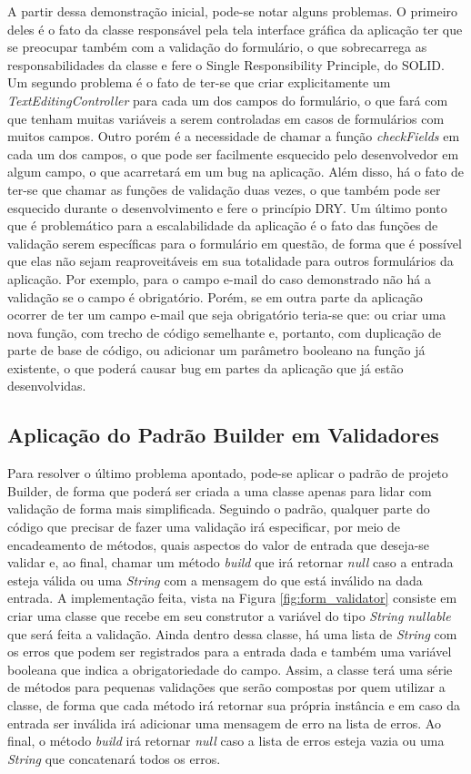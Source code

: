 \documentclass[12pt, %
openright, 
oneside, %
a4paper,    %
brazil]{facom-ufu-abntex2}
\begin{document}
A partir dessa demonstração inicial, pode-se notar alguns problemas. O primeiro deles é o fato da classe responsável pela tela interface gráfica da aplicação ter que se preocupar também com a validação do formulário, o que sobrecarrega as responsabilidades da classe e fere o Single Responsibility Principle, do SOLID. Um segundo problema é o fato de ter-se que criar explicitamente um \textit{TextEditingController} para cada um dos campos do formulário, o que fará com que tenham muitas variáveis a serem controladas em casos de formulários com muitos campos. Outro porém é a necessidade de chamar a função \textit{checkFields} em cada um dos campos, o que pode ser facilmente esquecido pelo desenvolvedor em algum campo, o que acarretará em um bug na aplicação. Além disso, há o fato de ter-se que chamar as funções de validação duas vezes, o que também pode ser esquecido durante o desenvolvimento e fere o princípio DRY. Um último ponto que é problemático para a escalabilidade da aplicação é o fato das funções de validação serem específicas para o formulário em questão, de forma que é possível que elas não sejam reaproveitáveis em sua totalidade para outros formulários da aplicação. Por exemplo, para o campo e-mail do caso demonstrado não há a validação se o campo é obrigatório. Porém, se em outra parte da aplicação ocorrer de ter um campo e-mail que seja obrigatório teria-se que: ou criar uma nova função, com trecho de código semelhante e, portanto, com duplicação de parte de base de código, ou adicionar um parâmetro booleano na função já existente, o que poderá causar bug em partes da aplicação que já estão desenvolvidas.

\subsection{Aplicação do Padrão Builder em Validadores}

Para resolver o último problema apontado, pode-se aplicar o padrão de projeto Builder, de forma que poderá ser criada a uma classe apenas para lidar com validação de forma mais simplificada. Seguindo o padrão, qualquer parte do código que precisar de fazer uma validação irá especificar, por meio de encadeamento de métodos, quais aspectos do valor de entrada que deseja-se validar e, ao final, chamar um método \textit{build} que irá retornar \textit{null} caso a entrada esteja válida ou uma \textit{String} com a mensagem do que está inválido na dada entrada. A implementação feita, vista na Figura \ref{fig:form_validator} consiste em criar uma classe que recebe em seu construtor a variável do tipo \textit{String nullable} que será feita a validação. Ainda dentro dessa classe, há uma lista de \textit{String} com os erros que podem ser registrados para a entrada dada e também uma variável booleana que indica a obrigatoriedade do campo. Assim, a classe terá uma série de métodos para pequenas validações que serão compostas por quem utilizar a classe, de forma que cada método irá retornar sua própria instância e em caso da entrada ser inválida irá adicionar uma mensagem de erro na lista de erros. Ao final, o método \textit{build} irá retornar \textit{null} caso a lista de erros esteja vazia ou uma \textit{String} que concatenará todos os erros.
\end{document}
